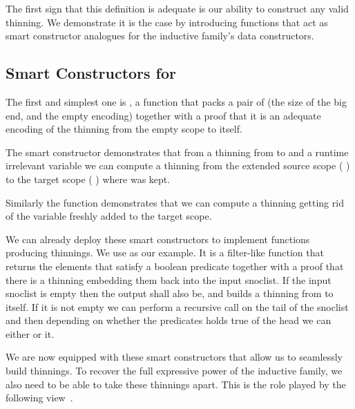 \documentclass{article}
\begin{document}

The first sign that this definition is adequate is our ability to construct
any valid thinning. We demonstrate it is the case by introducing functions
that act as smart constructor analogues for the inductive family's data
constructors.

\subsection{Smart Constructors for }

The first and simplest one is , a function that packs a pair of
 (the size of the big end, and the empty encoding) together with a proof
that it is an adequate encoding of the thinning from the empty scope to itself.


The  smart constructor demonstrates that from a thinning from
 to  and a runtime irrelevant variable 
we can compute a thinning from the extended source scope
( \IdrisData{:<} ) to the target scope
( \IdrisData{:<} ) where  was kept.


Similarly the  function demonstrates that we can compute a
thinning getting rid of the variable  freshly added to the target
scope.


We can already deploy these smart constructors to implement functions producing
thinnings. We use  as our example. It is a filter-like
function that returns the elements that satisfy a boolean predicate together with
a proof that there is a thinning embedding them back into the input snoclist.
%
If the input snoclist is empty then the output shall also be, and
 builds a thinning from \IdrisData{[<]} to itself.
%
If it is not empty we can perform a recursive call on the tail of the snoclist
and then depending on whether the predicates holds true of the head we can either
 or  it.


We are now equipped with these smart constructors that allow us to seamlessly
build thinnings.
%
To recover the full expressive power of the inductive family, we also need to
be able to take these thinnings apart. This is the role played by the following
view~\cite{DBLP:journals/jfp/McBrideM04}.
\end{document}
